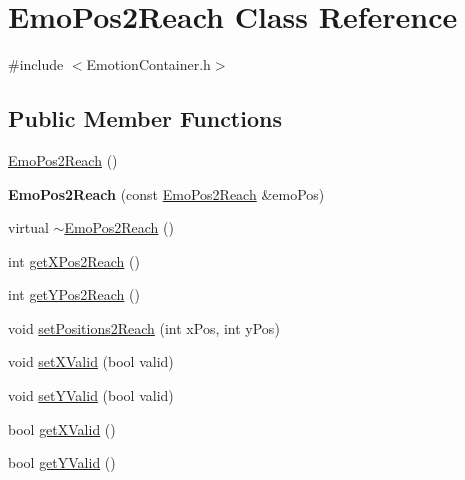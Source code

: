 \hypertarget{class_emo_pos2_reach}{
\section{\-Emo\-Pos2\-Reach \-Class \-Reference}
\label{class_emo_pos2_reach}
}


{\ttfamily \#include $<$\-Emotion\-Container.\-h$>$}

\subsection*{\-Public \-Member \-Functions}
\begin{DoxyCompactItemize}
\item 
\hyperlink{class_emo_pos2_reach_a8b150d60a80a759dc33f4ca52c7649f9}{\-Emo\-Pos2\-Reach} ()
\item 
\hypertarget{class_emo_pos2_reach_a73b3bd1eefbcdc5993dd19bddd3de0c1}{
{\bfseries \-Emo\-Pos2\-Reach} (const \hyperlink{class_emo_pos2_reach}{\-Emo\-Pos2\-Reach} \&emo\-Pos)}
\label{class_emo_pos2_reach_a73b3bd1eefbcdc5993dd19bddd3de0c1}

\item 
virtual \hyperlink{class_emo_pos2_reach_a59695111d41f3c0b7ebb0651f2d3a167}{$\sim$\-Emo\-Pos2\-Reach} ()
\item 
int \hyperlink{class_emo_pos2_reach_ac39da00fcf926534ad515d58b4655261}{get\-X\-Pos2\-Reach} ()
\item 
int \hyperlink{class_emo_pos2_reach_ae5c96309806115ebf1d4c89a072967c6}{get\-Y\-Pos2\-Reach} ()
\item 
void \hyperlink{class_emo_pos2_reach_a8c5472952913fd39881cb7c8306bb039}{set\-Positions2\-Reach} (int x\-Pos, int y\-Pos)
\item 
void \hyperlink{class_emo_pos2_reach_acd0790143f40a33195ffc62e146fa3b0}{set\-X\-Valid} (bool valid)
\item 
void \hyperlink{class_emo_pos2_reach_a57cc4adbba8486f1b27ca171ed3bd80d}{set\-Y\-Valid} (bool valid)
\item 
bool \hyperlink{class_emo_pos2_reach_aa500036b5172705a162467fffd9216eb}{get\-X\-Valid} ()
\item 
bool \hyperlink{class_emo_pos2_reach_a844aaa86d9adf370d8bef6387fd12e44}{get\-Y\-Valid} ()
\end{DoxyCompactItemize}
